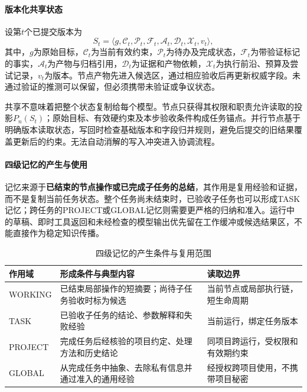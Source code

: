 \paragraph{版本化共享状态}
设第$t$个已提交版本为
\begin{equation}
S_t=\langle g,\mathcal{C}_t,\mathcal{P}_t,\mathcal{F}_t,
\mathcal{A}_t,\mathcal{D}_t,\mathcal{X}_t,v_t\rangle,
\end{equation}
其中，$g$为原始目标，$\mathcal{C}_t$为当前有效约束，$\mathcal{P}_t$为待办及完成状态，$\mathcal{F}_t$为带验证标记的事实，$\mathcal{A}_t$为产物与归档引用，$\mathcal{D}_t$为证据和产物依赖，$\mathcal{X}_t$为执行前沿、预算及尝试记录，$v_t$为版本。节点产物先进入候选区，通过相应验收后再更新权威字段。未通过验证的推测可以保留，但必须携带未验证或争议状态。

共享不意味着把整个状态复制给每个模型。节点只获得其权限和职责允许读取的投影$P_n(S_t)$；原始目标、有效硬约束及本步验收条件构成任务锚点。并行节点基于明确版本读取状态，写回时检查基础版本和字段归并规则，避免后提交的旧结果覆盖更新后的约束。无法自动消解的写入冲突进入协调流程。

\paragraph{四级记忆的产生与使用}
记忆来源于\textbf{已结束的节点操作或已完成子任务的总结}，其作用是复用经验和证据，而不是复制当前任务状态。整个任务尚未结束时，已验收子任务也可以形成TASK记忆；跨任务的PROJECT或GLOBAL记忆则需要更严格的归纳和准入。运行中的草稿、即时工具返回和未经检查的模型输出优先留在工作缓冲或候选结果区，不能直接作为稳定知识传播。

\begin{table}[htbp]
\centering
\caption{四级记忆的产生条件与复用范围}
\label{tab:anchor_memory_scopes}
\begin{tabular}{p{}p{}p{}}
\toprule
作用域 & 形成条件与典型内容 & 读取边界 \\
\midrule
WORKING & 已结束局部操作的短摘要；尚待子任务验收时标为候选 & 当前节点或局部执行链，短生命周期 \\
TASK & 已验收子任务的结论、参数解释和失败经验 & 当前运行，绑定任务版本 \\
PROJECT & 完成任务后经核验的项目约定、处理方法和历史结论 & 同项目跨运行，受权限和有效期约束 \\
GLOBAL & 从完成任务中抽象、去除私有信息并通过准入的通用经验 & 经授权跨项目使用，不携带项目秘密 \\
\bottomrule
\end{tabular}
\end{table}

